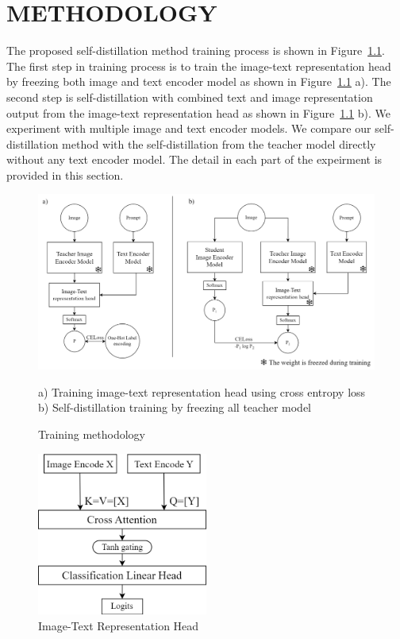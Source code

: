\chapter{METHODOLOGY}
\label{ch:methodology}

The proposed self-distillation method training process is shown in Figure~\ref{fig:methodology}.
The first step in training process is to train the image-text representation head by freezing both image and text encoder model as shown in Figure~\ref{fig:methodology} a).
The second step is self-distillation with combined text and image representation output from the image-text representation head as shown in Figure~\ref{fig:methodology} b).
We experiment with multiple image and text encoder models.
We compare our self-distillation method with the self-distillation from the teacher model directly without any text encoder model.
The detail in each part of the expeirment is provided in this section.

\begin{figure}[h]
    \caption{Training methodology}
    \label{fig:methodology}
    \begin{center}
        \includegraphics[width=1\textwidth]{Images/Methodology.png}
    \end{center}
    \small a) Training image-text representation head using cross entropy loss b) Self-distillation training by freezing all teacher model
\end{figure}

\begin{figure}[h]
    \caption{Image-Text Representation Head}
    \label{fig:cross_attention}
    \centering
    \includegraphics[width=0.5\textwidth]{Images/CrossAttention.png}
\end{figure}

